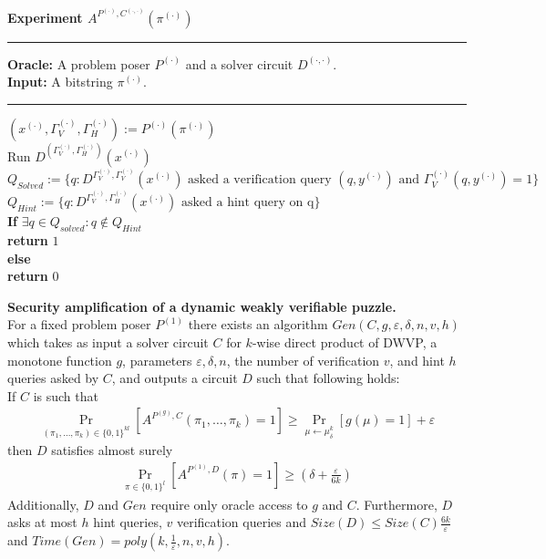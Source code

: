 %
%
\begin{codeblock}
  \textbf{Experiment $A^{P^{(\cdot)}, C^{(\cdot, \cdot)}}(\pi^{(\cdot)})$}
  \medskip

  \hrule

  \medskip

  \textbf{Oracle:} A problem poser $P^{(\cdot)}$ and a solver circuit $D^{(\cdot,\cdot)}$.\\
  \textbf{Input:}  A bitstring $\pi^{(\cdot)}$.

  \medskip\hrule\medskip

  $(x^{(\cdot)}, \Gamma_V^{(\cdot)}, \Gamma_H^{(\cdot)}) := P^{(\cdot)}(\pi^{(\cdot)})$ \\
  Run $D^{(\Gamma_V^{(\cdot)},\Gamma_H^{(\cdot)})}(x^{(\cdot)})$ \\
  \IndI $Q_{Solved} := \{q: \text{$D^{\Gamma_V^{(\cdot)}, \Gamma_V^{(\cdot)}}(x^{(\cdot)})$ asked a verification query $(q,y^{(\cdot)})$ and $\Gamma_V^{(\cdot)}(q, y^{(\cdot)}) = 1$} \}$\\
  \IndI $Q_{Hint} := \{q: \text{$D^{\Gamma_V^{(\cdot)}, \Gamma_H^{(\cdot)}}(x^{(\cdot)})$ asked a hint query on q} \}$\\
  \textbf{If} $\exists q \in Q_{solved} : q \notin Q_{Hint}$\\
  \IndI \textbf{return} $1$\\
  \textbf{else}\\
  \IndI \textbf{return} $0$\\
\end{codeblock}
%
%
\begin{theorem}{\textbf{Security amplification of a dynamic weakly verifiable puzzle.}}\\
  For a fixed problem poser $P^{(1)}$ there exists an algorithm $Gen(C, g, \varepsilon, \delta, n, v, h)$ which takes as input a solver circuit $C$ for $k$-wise
  direct product of DWVP, a monotone function $g$, parameters $\varepsilon, \delta,n$, the number of verification $v$, and hint $h$ queries asked by $C$, and outputs a circuit $D$
  such that following holds: \\
  If $C$ is such that \\
  \begin{align*}
    \underset{(\pi_1, \dots, \pi_k) \in \{0,1\}^{kl}}{\Pr}[A^{P^{(g)}, C}(\pi_1, \dots, \pi_k) = 1] \geq \underset{\mu \leftarrow \mu_\delta^k}{\Pr}[g(\mu) = 1] + \varepsilon
  \end{align*}
  then $D$ satisfies almost surely
  \begin{align*}
    \underset{\pi \in \{0,1\}^{l}}{\Pr}[A^{P^{(1)},D}(\pi) = 1] \geq (\delta + \frac{\varepsilon}{6k})
  \end{align*}
  Additionally, $D$ and $Gen$ require only oracle access to $g$ and $C$. Furthermore, $D$ asks at most $h$ hint queries, $v$ verification queries and
  $Size(D) \leq Size(C)\frac{6k}{\varepsilon}$ and $Time(Gen) = poly(k, \frac{1}{\varepsilon}, n, v, h)$.
\end{theorem}
